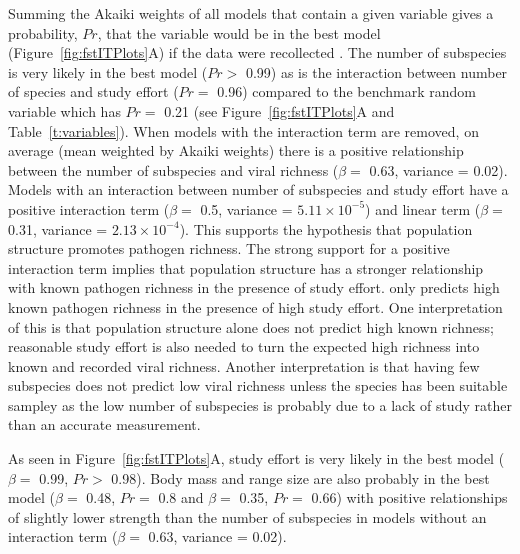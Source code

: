 Summing the Akaiki weights of all models that contain a given variable gives a probability, $Pr$, that the variable would be in the best model (Figure~\ref{fig:fstITPlots}A) if the data were recollected \cite{whittingham2006we}.
The number of subspecies is very likely in the best model ($Pr > $ 0.99) as is the interaction between number of species and study effort ($Pr = $ 0.96) compared to the benchmark random variable which has $Pr = $ 0.21 (see Figure~\ref{fig:fstITPlots}A and Table~\ref{t:variables}).
When models with the interaction term are removed, on average (mean weighted by Akaiki weights) there is a positive relationship between the number of subspecies and viral richness ($\beta = $ 0.63, variance = 0.02).
Models with an interaction between number of subspecies and study effort have a positive interaction term ($\beta = $ 0.5, variance = \ensuremath{5.11\times 10^{-5}}) and linear term ($\beta = $ 0.31, variance = \ensuremath{2.13\times 10^{-4}}).
This supports the hypothesis that population structure promotes pathogen richness.
The strong support for a positive interaction term implies that population structure has a stronger relationship with known pathogen richness in the presence of study effort.
only predicts high known pathogen richness in the presence of high study effort.
One interpretation of this is that population structure alone does not predict high known richness; reasonable study effort is also needed to turn the expected high richness into known and recorded viral richness.
Another interpretation is that having few subspecies does not predict low viral richness unless the species has been suitable sampley as the low number of subspecies is probably due to a lack of study rather than an accurate measurement.


As seen in Figure~\ref{fig:fstITPlots}A, study effort is very likely in the best model ($\beta = $ 0.99, $Pr > $ 0.98).
Body mass and range size are also probably in the best model ($\beta = $ 0.48, $Pr = $ 0.8 and $\beta = $ 0.35, $Pr = $ 0.66) with positive relationships of slightly lower strength than the number of subspecies in models without an interaction term ($\beta = $ 0.63, variance = 0.02).	



